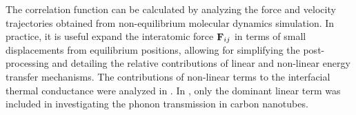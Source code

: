 The correlation function can be calculated by analyzing the force and velocity trajectories obtained from non-equilibrium molecular dynamics simulation. In practice, it is useful expand the interatomic force $\mathbf{F}_{ij}$ in terms of small displacements from equilibrium positions, allowing for simplifying the post-processing and detailing the relative contributions of linear and non-linear energy transfer mechanisms. The contributions of non-linear terms to the interfacial thermal conductance were analyzed in . In , only the dominant linear term was included in investigating the phonon transmission in carbon nanotubes.

\fi






